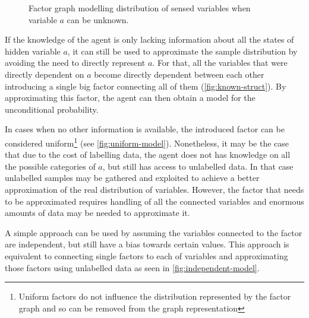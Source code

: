 \begin{figure}[h]
{
}
\caption{\label{fig:known-struct}Factor graph modelling distribution of sensed variables when variable $a$ can be unknown.}
\end{figure}



If the knowledge of the agent is only lacking information about all the states
of hidden variable $a$, it can still be used to approximate the sample distribution 
by avoiding the need to directly represent $a$. For that, all the variables that were 
directly dependent on $a$ become directly dependent between each other introducing a 
single big factor connecting all of them (\autoref{fig:known-struct}).
By approximating this factor, the agent can then obtain a model for the unconditional probability.

In cases when no other information is available, the introduced factor can
be considered uniform\footnote{Uniform factors do not influence the
distribution represented by the factor graph and so can be removed
from the graph representation} (see \autoref{fig:uniform-model}).
Nonetheless, it may be the case that due to the cost of labelling data,
the agent does not has knowledge on all the possible categories of $a$,
but still has access to unlabelled data.
In that case unlabelled samples may be gathered and exploited to
achieve a better approximation of the real distribution of variables.
However, the factor that needs to be approximated requires handling of
all the connected variables and enormous amounts of data may be
needed to approximate it.

A simple approach can be used by assuming the variables connected
to the factor are independent, but still have a bias towards certain values. 
This approach is equivalent to connecting single factors
to each of variables and approximating those factors using unlabelled
data as seen in \autoref{fig:independent-model}.

